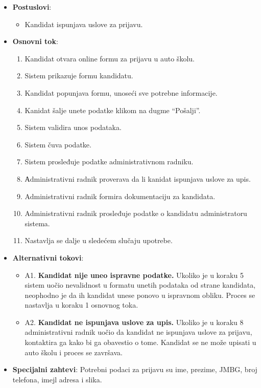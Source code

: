 \begin{itemize}
\begin{itemize}
    \end{itemize}
  \item \textbf{Postuslovi}:
      \begin{itemize}
      \item Kandidat ispunjava uslove za prijavu.
      \end{itemize}
  \item \textbf{Osnovni tok}:
      \begin{enumerate}
        \item Kandidat otvara online formu za prijavu u auto školu.
        \item Sistem prikazuje formu kandidatu.
        \item Kandidat popunjava formu, unoseći sve potrebne informacije.
        \item Kanidat šalje unete podatke klikom na dugme “Pošalji”.
        \item Sistem validira unos podataka.
        \item Sistem čuva podatke.
        \item Sistem prosleđuje podatke administrativnom radniku.
        \item Аdministrativni radnik proverava da li kanidat ispunjava uslove za upis.
        \item Administrativni radnik formira dokumentaciju za kandidata.
        \item Administrativni radnik prosleđuje podatke o kandidatu administratoru sistema.
        \item Nastavlja se dalje u sledećem slučaju upotrebe.
      \end{enumerate}

  \item \textbf{Alternativni tokovi}:
      \begin{itemize}
        \item A1. \textbf{Kandidat nije uneo ispravne podatke.}
        Ukoliko je u koraku 5 sistem uočio nevalidnost u formatu unetih podataka od strane kandidata, neophodno je da ih kandidat unese ponovo u ispravnom obliku.
        Proces se nastavlja u koraku 1 osnovnog toka.
        \item A2. \textbf{Kandidat ne ispunjava uslove za upis.}
        Ukoliko je u koraku 8 administrativni radnik uočio da kandidat ne ispunjava uslove za prijavu, kontaktira ga kako bi ga obavestio o tome.
        Kandidat se ne može upisati u auto školu i proces se završava.
      \end{itemize}

  \item \textbf{Specijalni zahtevi}:\newline
  Potrebni podaci za prijavu su ime, prezime, JMBG, broj telefona, imejl adresa i slika.
\end{itemize}

